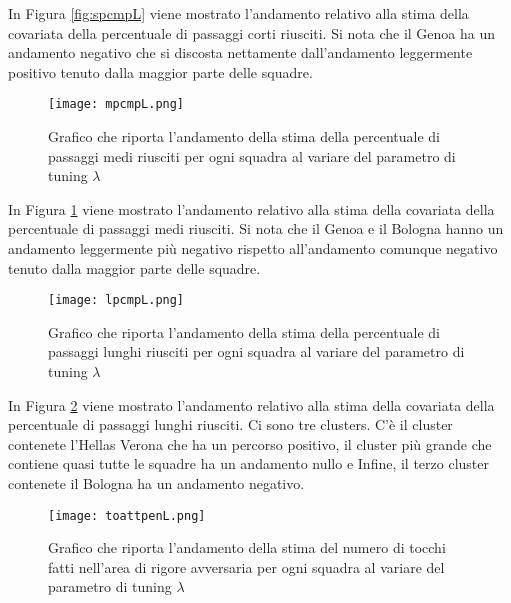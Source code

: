 In Figura \ref{fig:spcmpL} viene mostrato l'andamento relativo alla stima della covariata della percentuale di passaggi corti riusciti. Si nota che il Genoa ha un andamento negativo che si discosta nettamente dall'andamento leggermente positivo tenuto dalla maggior parte delle squadre.

\begin{figure}[htbp]
	\begin{center}
		\texttt{[image: mpcmpL.png]}
		\caption{Grafico che riporta l'andamento della stima della percentuale di passaggi medi riusciti per ogni squadra al variare del parametro di tuning $\lambda$} \label{fig:mpcmpL}
	\end{center}
\end{figure}

In Figura \ref{fig:mpcmpL} viene mostrato l'andamento relativo alla stima della covariata della percentuale di passaggi medi riusciti. Si nota che il Genoa e il Bologna hanno un andamento leggermente più negativo rispetto all'andamento comunque negativo tenuto dalla maggior parte delle squadre.

\begin{figure}[htbp]
	\begin{center}
		\texttt{[image: lpcmpL.png]}
		\caption{Grafico che riporta l'andamento della stima della percentuale di passaggi lunghi riusciti per ogni squadra al variare del parametro di tuning $\lambda$} \label{fig:lpcmpL}
	\end{center}
\end{figure}

In Figura \ref{fig:lpcmpL} viene mostrato l'andamento relativo alla stima della covariata della percentuale di passaggi lunghi riusciti. Ci sono tre clusters. C'è il cluster contenete l'Hellas Verona che ha un percorso positivo, il cluster più grande che contiene quasi tutte le squadre ha un andamento nullo e Infine, il terzo cluster contenete il Bologna ha un andamento negativo.

\begin{figure}[htbp]
	\begin{center}
		\texttt{[image: toattpenL.png]}
		\caption{Grafico che riporta l'andamento della stima del numero di tocchi fatti nell'area di rigore avversaria per ogni squadra al variare del parametro di tuning $\lambda$} \label{fig:toattpenL}
	\end{center}
\end{figure}

